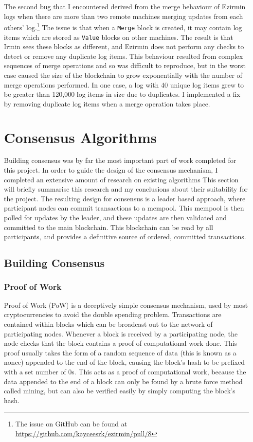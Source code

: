 \documentclass[12pt,a4paper,twoside,openright]{report}
\begin{document}
	The second bug that I encountered derived from the merge behaviour of Ezirmin logs when there are more than two remote machines merging updates from each others' log.\footnote{The issue on GitHub can be found at \href{https://github.com/kayceesrk/ezirmin/pull/8}{https://github.com/kayceesrk/ezirmin/pull/8}}
	The issue is that when a \texttt{Merge} block is created, it may contain log items which are stored as \texttt{Value} blocks on other machines.
	The result is that Irmin sees these blocks as different, and Ezirmin does not perform any checks to detect or remove any duplicate log items.
	This behaviour resulted from complex sequences of merge operations and so was difficult to reproduce, but in the worst case caused the size of the blockchain to grow exponentially with the number of merge operations performed.
	In one case, a log with 40 unique log items grew to be greater than 120,000 log items in size due to duplicates.
	I implemented a fix by removing duplicate log items when a merge operation takes place. 

	\section{Consensus Algorithms}
	Building consensus was by far the most important part of work completed for this project. 
	In order to guide the design of the consensus mechanism, I completed an extensive amount of research on existing algorithms
	This section will briefly summarise this research and my conclusions about their suitability for the project. 
	The resulting design for consensus is a leader based approach, where participant nodes can commit transactions to a mempool.
	This mempool is then polled for updates by the leader, and these updates are then validated and committed to the main blockchain.
	This blockchain can be read by all participants, and provides a definitive source of ordered, committed transactions.

		\subsection{Building Consensus}
			\subsubsection*{Proof of Work}
			Proof of Work (PoW) is a deceptively simple consensus mechanism, used by most cryptocurrencies to avoid the double spending problem.
			Transactions are contained within blocks which can be broadcast out to the network of participating nodes. 
			Whenever a block is received by a participating node, the node checks that the block contains a proof of computational work done. 
			This proof usually takes the form of a random sequence of data (this is known as a nonce) appended to the end of the block, causing the block's hash to be prefixed with a set number of 0s.
			This acts as a proof of computational work, because the data appended to the end of a block can only be found by a brute force method called mining, but can also be verified easily by simply computing the block's hash.\\
			
\end{document}
